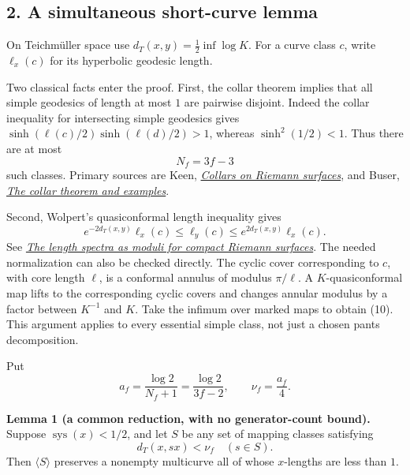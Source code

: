 \documentclass[
  11pt,
]{article}
\begin{document}
\hypertarget{a-simultaneous-short-curve-lemma}{%
\subsection{2. A simultaneous short-curve
lemma}\label{a-simultaneous-short-curve-lemma}}

On Teichmüller space use \(d_T(x,y)=\tfrac12\inf\log K\). For a curve
class \(c\), write \(\ell_x(c)\) for its hyperbolic geodesic length.

Two classical facts enter the proof. First, the collar theorem implies
that all simple geodesics of length at most \(1\) are pairwise disjoint.
Indeed the collar inequality for intersecting simple geodesics gives
\(\sinh(\ell(c)/2)\sinh(\ell(d)/2)>1\), whereas \(\sinh^2(1/2)<1\). Thus
there are at most \[
                              N_f=3f-3                         \tag{9}
\] such classes. Primary sources are Keen,
\href{https://doi.org/10.1515/9781400881642-021}{\emph{Collars on
Riemann surfaces}}, and Buser,
\href{https://doi.org/10.1007/BF01168048}{\emph{The collar theorem and
examples}}.

Second, Wolpert's quasiconformal length inequality gives \[
 e^{-2d_T(x,y)}\ell_x(c)
       \le\ell_y(c)\le e^{2d_T(x,y)}\ell_x(c).                 \tag{10}
\] See \href{https://annals.math.princeton.edu/1979/109-2/p03}{\emph{The
length spectra as moduli for compact Riemann surfaces}}. The needed
normalization can also be checked directly. The cyclic cover
corresponding to \(c\), with core length \(\ell\), is a conformal
annulus of modulus \(\pi/\ell\). A \(K\)-quasiconformal map lifts to the
corresponding cyclic covers and changes annular modulus by a factor
between \(K^{-1}\) and \(K\). Take the infimum over marked maps to
obtain (10). This argument applies to every essential simple class, not
just a chosen pants decomposition.

Put \[
 a_f=\frac{\log2}{N_f+1}=\frac{\log2}{3f-2},
 \qquad \nu_f=\frac{a_f}{4}.                                 \tag{11}
\]

\textbf{Lemma 1 (a common reduction, with no generator-count bound).}
Suppose \(\operatorname{sys}(x)<1/2\), and let \(S\) be any set of
mapping classes satisfying \[
                          d_T(x,sx)<\nu_f\quad(s\in S).        \tag{12}
\] Then \(\langle S\rangle\) preserves a nonempty multicurve all of
whose \(x\)-lengths are less than \(1\).
\end{document}
